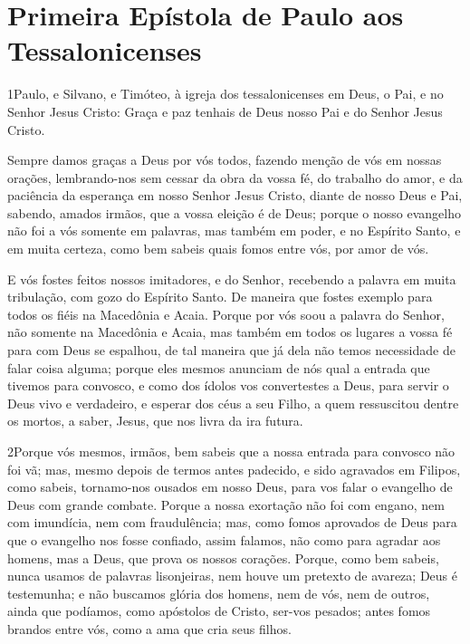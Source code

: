 \thispagestyle{empty}
\chapter*{Primeira Epístola de Paulo aos Tessalonicenses}

\lettrine{1} Paulo, e Silvano, e Timóteo, à igreja dos
tessalonicenses em Deus, o Pai, e no Senhor Jesus Cristo: Graça e
paz tenhais de Deus nosso Pai e do Senhor Jesus Cristo.

Sempre damos graças a Deus por vós todos, fazendo menção de vós em
nossas orações, lembrando-nos sem cessar da obra da vossa fé, do
trabalho do amor, e da paciência da esperança em nosso Senhor Jesus
Cristo, diante de nosso Deus e Pai, sabendo, amados irmãos, que
a vossa eleição é de Deus; porque o nosso evangelho não foi a
vós somente em palavras, mas também em poder, e no Espírito Santo, e
em muita certeza, como bem sabeis quais fomos entre vós, por amor de
vós.

E vós fostes feitos nossos imitadores, e do Senhor, recebendo a
palavra em muita tribulação, com gozo do Espírito Santo. De
maneira que fostes exemplo para todos os fiéis na Macedônia e Acaia.
Porque por vós soou a palavra do Senhor, não somente na
Macedônia e Acaia, mas também em todos os lugares a vossa fé para
com Deus se espalhou, de tal maneira que já dela não temos
necessidade de falar coisa alguma; porque eles mesmos anunciam
de nós qual a entrada que tivemos para convosco, e como dos ídolos
vos convertestes a Deus, para servir o Deus vivo e verdadeiro,
e esperar dos céus a seu Filho, a quem ressuscitou dentre os
mortos, a saber, Jesus, que nos livra da ira futura.

\medskip

\lettrine{2} Porque vós mesmos, irmãos, bem sabeis que a nossa
entrada para convosco não foi vã; mas, mesmo depois de termos
antes padecido, e sido agravados em Filipos, como sabeis,
tornamo-nos ousados em nosso Deus, para vos falar o evangelho de
Deus com grande combate. Porque a nossa exortação não foi com
engano, nem com imundícia, nem com fraudulência; mas, como fomos
aprovados de Deus para que o evangelho nos fosse confiado, assim
falamos, não como para agradar aos homens, mas a Deus, que prova os
nossos corações. Porque, como bem sabeis, nunca usamos de
palavras lisonjeiras, nem houve um pretexto de avareza; Deus é
testemunha; e não buscamos glória dos homens, nem de vós, nem de
outros, ainda que podíamos, como apóstolos de Cristo, ser-vos
pesados; antes fomos brandos entre vós, como a ama que cria seus
filhos.

